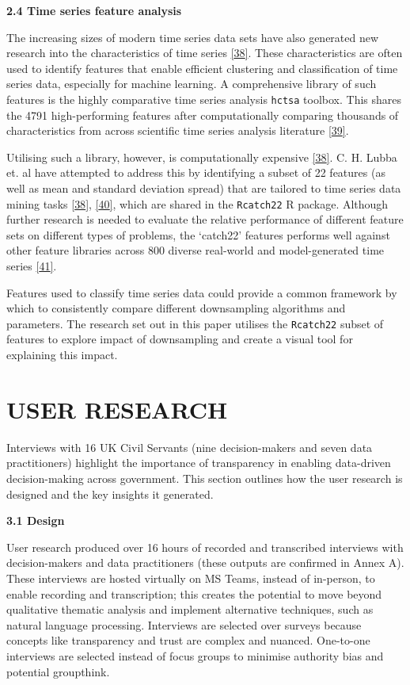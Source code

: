\documentclass{article}
\begin{document}
\textbf{2.4 Time series feature analysis}

The increasing sizes of modern time series data sets have also generated
new research into the characteristics of time series
\protect\hyperlink{ref-catch22}{{[}38{]}}. These characteristics are
often used to identify features that enable efficient clustering and
classification of time series data, especially for machine learning. A
comprehensive library of such features is the highly comparative time
series analysis \texttt{hctsa} toolbox. This shares the 4791
high-performing features after computationally comparing thousands of
characteristics from across scientific time series analysis literature
\protect\hyperlink{ref-fulcher2017}{{[}39{]}}.

Utilising such a library, however, is computationally expensive
\protect\hyperlink{ref-catch22}{{[}38{]}}. C. H. Lubba et. al have
attempted to address this by identifying a subset of 22 features (as
well as mean and standard deviation spread) that are tailored to time
series data mining tasks \protect\hyperlink{ref-catch22}{{[}38{]}},
\protect\hyperlink{ref-bagnall}{{[}40{]}}, which are shared in the
\texttt{Rcatch22} R package. Although further research is needed to
evaluate the relative performance of different feature sets on different
types of problems, the `catch22' features performs well against other
feature libraries across 800 diverse real-world and model-generated time
series \protect\hyperlink{ref-henderson}{{[}41{]}}.

Features used to classify time series data could provide a common
framework by which to consistently compare different downsampling
algorithms and parameters. The research set out in this paper utilises
the \texttt{Rcatch22} subset of features to explore impact of
downsampling and create a visual tool for explaining this impact.

\hypertarget{user-research}{%
\section{USER RESEARCH}\label{user-research}}

Interviews with 16 UK Civil Servants (nine decision-makers and seven
data practitioners) highlight the importance of transparency in enabling
data-driven decision-making across government. This section outlines how
the user research is designed and the key insights it generated.

\textbf{3.1 Design}

User research produced over 16 hours of recorded and transcribed
interviews with decision-makers and data practitioners (these outputs
are confirmed in Annex A). These interviews are hosted virtually on MS
Teams, instead of in-person, to enable recording and transcription; this
creates the potential to move beyond qualitative thematic analysis and
implement alternative techniques, such as natural language processing.
Interviews are selected over surveys because concepts like transparency
and trust are complex and nuanced. One-to-one interviews are selected
instead of focus groups to minimise authority bias and potential
groupthink.
\end{document}
